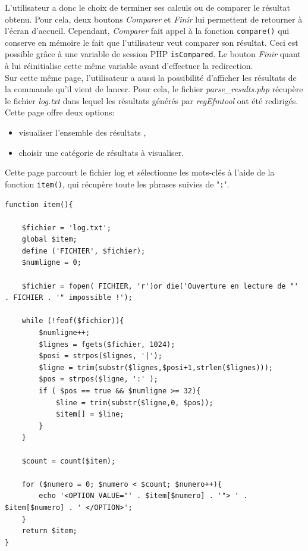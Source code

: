 L'utilisateur a donc le choix de terminer ses calculs ou de comparer le résultat obtenu. Pour cela, deux boutons \textit{Comparer} et \textit{Finir} lui permettent de retourner à l'écran d'accueil. Cependant, \textit{Comparer} fait appel à la fonction \texttt{compare()}  qui conserve en mémoire le fait que l'utilisateur veut comparer son résultat. Ceci est possible grâce à une variable de session PHP \texttt{isCompared}. Le bouton \textit{Finir} quant à lui réinitialise cette m\^eme variable avant d'effectuer la redirection.\\

Sur cette même page, l'utilisateur a aussi la possibilité d'afficher les résultats de la commande qu'il vient de lancer. Pour cela, le fichier \emph{parse\_results.php} récupère le fichier \emph{log.txt} dans lequel les résultats générés par \textit{regEfmtool} ont été redirigés. \\

Cette page offre deux options:
\begin{itemize}
\item visualiser l'ensemble des résultats ,
\item choisir une catégorie de résultats à visualiser.
\end{itemize}

Cette page parcourt le fichier log et sélectionne les mots-clés à l'aide de la fonction \texttt{item()}, qui récupère toute les phrases suivies de "\texttt{:}".

\begin{DDbox}{\linewidth}
\begin{lstlisting}
function item(){
					
	$fichier = 'log.txt';
	global $item;
	define ('FICHIER', $fichier);
	$numligne = 0;

	$fichier = fopen( FICHIER, 'r')or die('Ouverture en lecture de "' . FICHIER . '" impossible !');
					
	while (!feof($fichier)){
		$numligne++;
		$lignes = fgets($fichier, 1024);
		$posi = strpos($lignes, '|'); 
		$ligne = trim(substr($lignes,$posi+1,strlen($lignes))); 
		$pos = strpos($ligne, ':' );
		if ( $pos == true && $numligne >= 32){
			$line = trim(substr($ligne,0, $pos)); 
			$item[] = $line;
		}
	}
					
	$count = count($item);
					
	for ($numero = 0; $numero < $count; $numero++){
		echo '<OPTION VALUE="' . $item[$numero] . '"> ' . $item[$numero] . ' </OPTION>'; 
	}
	return $item;
}
\end{lstlisting}
\end{DDbox}

